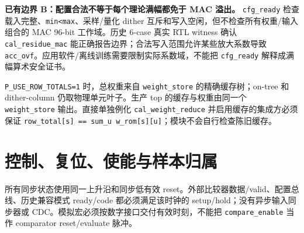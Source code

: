 \documentclass[UTF8,fontset=fandol,10pt,a4paper,openany]{ctexrep}
\newcommand{\code}[1]{\nolinkurl{#1}}
\begin{document}
\textbf{已有边界 B：配置合法不等于每个理论满幅都免于 MAC 溢出。} \code{cfg_ready} 检查载入完整、\code{min<max}、采样/量化 dither 互斥和写入空闲，但不检查所有权重/输入组合的 MAC 96-bit 工作域。历史 6-case 真实 RTL witness 确认 \code{cal_residue_mac} 能正确报告边界；合法写入范围允许某些放大系数导致 \code{acc_ovf}。应用软件/离线训练需要限制实际系数域，不能把 \code{cfg_ready} 解释成满幅算术安全证书。


\code{P_USE_ROW_TOTALS=1} 时，总权重来自 \code{weight_store} 的精确缓存树；on-tree 和 dither-column 仍取物理单元叶子。生产 top 的缓存与权重由同一个 \code{weight_store} 输出。直接单独例化 \code{cal_weight_reduce} 并启用缓存的集成方必须保证 \code{row_total[s] == sum_u w_rom[s][u]}；模块不会自行检查陈旧缓存。


\section{控制、复位、使能与样本归属}


所有同步状态使用同一上升沿和同步低有效 reset。外部比较器数据/valid、配置总线、历史兼容模式 ready/code 都必须满足该时钟的 setup/hold；没有异步输入同步器或 CDC。模拟宏必须按数字接口交付有效时刻，不能把 \code{compare_enable} 当作 comparator reset/evaluate 脉冲。
\end{document}
